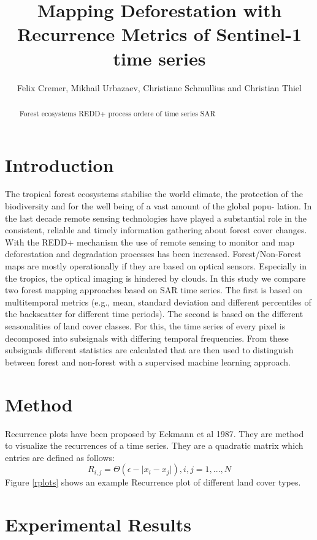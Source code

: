 \documentclass{article}
\title{Mapping Deforestation with Recurrence Metrics of Sentinel-1 time series}
\author{Felix Cremer, Mikhail Urbazaev, Christiane Schmullius and Christian Thiel}
\begin{document}
\maketitle
\begin{abstract}
  Forest ecosystems
  REDD+ process
  ordere of time series
  SAR

%
\end{abstract}
\section{Introduction}
The tropical forest ecosystems stabilise the world climate\cite{}, the protection of the biodiversity \cite{} and
for the well being of a vast amount of the global popu-
lation\cite{}.
 In the last decade remote sensing technologies have
played a substantial role in the consistent, reliable and timely
information gathering about forest cover changes. With the
REDD+ mechanism the use of remote sensing to monitor
and map deforestation and degradation processes has been
increased. Forest/Non-Forest maps are mostly operationally if
they are based on optical sensors. Especially in the tropics,
the optical imaging is hindered by clouds. In this study we
compare two forest mapping approaches based on SAR time
series. The first is based on multitemporal metrics (e.g., mean,
standard deviation and different percentiles of the backscatter
for different time periods). The second is based on the different
seasonalities of land cover classes. For this, the time series
of every pixel is decomposed into subsignals with differing
temporal frequencies. From these subsignals different statistics
are calculated that are then used to distinguish between forest
and non-forest with a supervised machine learning approach.


\section{Method}

Recurrence plots have been proposed by Eckmann et al 1987. They are method to visualize the recurrences of a time series. They are a quadratic matrix which entries are defined as follows:
$$R_{i,j} = \Theta(\epsilon - \lvert x_i - x_j \rvert), i,j = 1,...,N$$
Figure \ref{rplots} shows an example Recurrence plot of different land cover types.


\section{Experimental Results}
\end{document}
